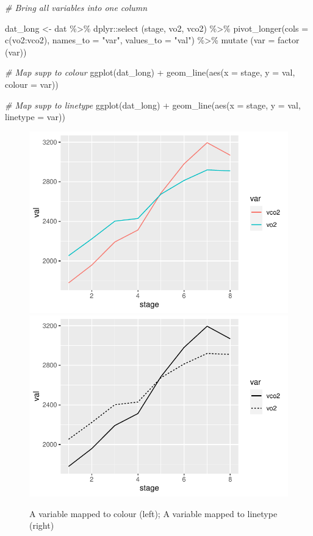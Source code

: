 \documentclass[
]{book}
\newenvironment{Shaded}{\begin{snugshade}}{\end{snugshade}}
\newcommand{\AttributeTok}[1]{\textcolor[rgb]{0.77,0.63,0.00}{#1}}
\newcommand{\CommentTok}[1]{\textcolor[rgb]{0.56,0.35,0.01}{\textit{#1}}}
\newcommand{\FunctionTok}[1]{\textcolor[rgb]{0.00,0.00,0.00}{#1}}
\newcommand{\NormalTok}[1]{#1}
\newcommand{\OtherTok}[1]{\textcolor[rgb]{0.56,0.35,0.01}{#1}}
\newcommand{\SpecialCharTok}[1]{\textcolor[rgb]{0.00,0.00,0.00}{#1}}
\newcommand{\StringTok}[1]{\textcolor[rgb]{0.31,0.60,0.02}{#1}}
\begin{document}
\begin{Shaded}
\begin{Highlighting}[]

\CommentTok{\# Bring all variables into one column}

\NormalTok{dat\_long }\OtherTok{\textless{}{-}}\NormalTok{ dat }\SpecialCharTok{\%\textgreater{}\%}
\NormalTok{  dplyr}\SpecialCharTok{::}\FunctionTok{select}\NormalTok{ (stage, vo2, vco2) }\SpecialCharTok{\%\textgreater{}\%} 
  \FunctionTok{pivot\_longer}\NormalTok{(}\AttributeTok{cols =} \FunctionTok{c}\NormalTok{(vo2}\SpecialCharTok{:}\NormalTok{vco2),}
               \AttributeTok{names\_to =} \StringTok{"var"}\NormalTok{,}
               \AttributeTok{values\_to =} \StringTok{"val"}\NormalTok{) }\SpecialCharTok{\%\textgreater{}\%}
  \FunctionTok{mutate}\NormalTok{ (}\AttributeTok{var =} \FunctionTok{factor}\NormalTok{ (var))}

\CommentTok{\# Map supp to colour}
\FunctionTok{ggplot}\NormalTok{(dat\_long) }\SpecialCharTok{+}
  \FunctionTok{geom\_line}\NormalTok{(}\FunctionTok{aes}\NormalTok{(}\AttributeTok{x =}\NormalTok{ stage, }\AttributeTok{y =}\NormalTok{ val, }\AttributeTok{colour =}\NormalTok{ var))}

\CommentTok{\# Map supp to linetype}
\FunctionTok{ggplot}\NormalTok{(dat\_long) }\SpecialCharTok{+}
  \FunctionTok{geom\_line}\NormalTok{(}\FunctionTok{aes}\NormalTok{(}\AttributeTok{x =}\NormalTok{ stage, }\AttributeTok{y =}\NormalTok{ val, }\AttributeTok{linetype =}\NormalTok{ var))}
\end{Highlighting}
\end{Shaded}

\begin{figure}

{\centering \includegraphics[width=0.5\linewidth]{se201_stats_book_files/figure-latex/FIG-LINE-GRAPH-MULTI-LINE-COLOR-TYPE-1} \includegraphics[width=0.5\linewidth]{se201_stats_book_files/figure-latex/FIG-LINE-GRAPH-MULTI-LINE-COLOR-TYPE-2} 

}

\caption[A variable mapped to colour (left)]{A variable mapped to colour (left); A variable mapped to linetype (right)}\label{fig:FIG-LINE-GRAPH-MULTI-LINE-COLOR-TYPE}
\end{figure}
\end{document}
